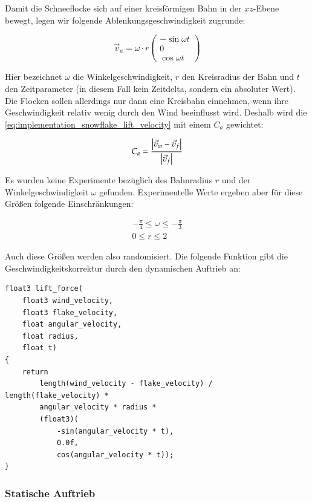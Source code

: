 Damit die Schneeflocke sich auf einer kreisförmigen Bahn in der
$xz$-Ebene bewegt, legen wir folgende Ablenkungsgeschwindigkeit zugrunde:

\begin{equation}
\label{eq:implementation_snowflake_lift_velocity}
\vec{v}_{a} =
\omega \cdot r
\left(
\begin{array}{c}
-\sin{\omega t} \\
0 \\
\cos{\omega t}
\end{array}
\right)
\end{equation}

Hier bezeichnet $\omega$ die Winkelgeschwindigkeit, $r$ den
Kreisradius der Bahn und $t$ den Zeitparameter (in diesem Fall kein
Zeitdelta, sondern ein absoluter Wert). Die Flocken sollen allerdings
nur dann eine Kreisbahn einnehmen, wenn ihre Geschwindigkeit relativ
wenig durch den Wind beeinflusst wird. Deshalb wird die
\cref{eq:implementation_snowflake_lift_velocity} mit einem $C_a$
gewichtet:

\begin{equation}
C_a =
\frac
{
  \left|\vec{v}_w - \vec{v}_f\right|
}
{
  \left|\vec{v}_f\right|
}
\end{equation}

Es wurden keine Experimente bezüglich des Bahnradius $r$ und der
Winkelgeschwindigkeit $\omega$ gefunden. Experimentelle Werte ergeben
aber für diese Größen folgende Einschränkungen:

\begin{gather}
-\frac{\pi}{4} \leq \omega \leq -\frac{\pi}{3} \\
0 \leq r \leq 2
\end{gather}

Auch diese Größen werden also randomisiert. Die folgende Funktion gibt
die Geschwindigkeitskorrektur durch den dynamischen Auftrieb an:

\begin{verbatim}
float3 lift_force(
    float3 wind_velocity,
    float3 flake_velocity,
    float angular_velocity,
    float radius,
    float t)
{
    return
        length(wind_velocity - flake_velocity) / length(flake_velocity) *
        angular_velocity * radius *
        (float3)(
            -sin(angular_velocity * t),
            0.0f,
            cos(angular_velocity * t));
}
\end{verbatim}

\subsubsection{Statische Auftrieb}

